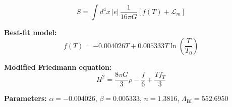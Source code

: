 
\begin{equation}
  S = \int d^4x \, |e| \, \frac{1}{16\pi G} \left[ f(T) + \mathcal{L}_m \right]
\end{equation}

\textbf{Best-fit model:}
\begin{equation}
  f(T) = -0.004026 T + 0.005333 T \ln\!\left(\frac{T}{T_0}\right)
\end{equation}

\textbf{Modified Friedmann equation:}
\begin{equation}
  H^2 = \frac{8\pi G}{3} \rho - \frac{f}{6} + \frac{T f_T}{3}
\end{equation}

\textbf{Parameters:}
$\alpha = -0.004026$, \quad
$\beta = 0.005333$, \quad
$n = 1.3816$, \quad
$\Lambda_{\text{BI}} = 552.6950$